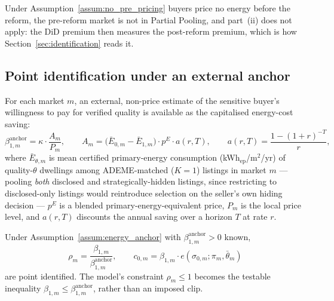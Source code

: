 \noindent Under Assumption~\ref{assum:no_pre_pricing} buyers price no energy before the reform, the pre-reform market is not in Partial Pooling, and part~(ii) does not apply: the DiD premium then measures the post-reform premium, which is how Section~\ref{sec:identification} reads it.

\subsection*{Point identification under an external anchor}

\begin{assumption}
\label{assum:energy_anchor}
For each market $m$, an external, non-price estimate of the sensitive buyer's willingness to
pay for verified quality is available as the capitalised energy-cost saving:
\begin{equation}
    \beta_{1,m}^{\mathrm{anchor}} = \kappa\cdot\frac{A_m}{P_m}, \qquad
    A_m = \big(\bar E_{0,m}-\bar E_{1,m}\big)\cdot p^E\cdot a(r,T), \qquad
    a(r,T)=\frac{1-(1+r)^{-T}}{r},
    \label{eq:energy_anchor}
\end{equation}
where $\bar E_{\theta,m}$ is mean certified primary-energy consumption (kWh$_{\mathrm{ep}}$/m$^2$/yr)
of quality-$\theta$ dwellings among ADEME-matched ($K=1$) listings in market $m$ --- pooling
\emph{both} disclosed and strategically-hidden listings, since restricting to disclosed-only
listings would reintroduce selection on the seller's own hiding decision --- $p^E$ is a
blended primary-energy-equivalent price, $P_m$ is the local price level, and $a(r,T)$ discounts
the annual saving over a horizon $T$ at rate $r$.
\end{assumption}

\begin{proposition}
\label{prop:anchored_identification}
Under Assumption~\ref{assum:energy_anchor} with $\beta_{1,m}^{\mathrm{anchor}}>0$ known,
\begin{equation}
    \rho_m=\frac{\beta_{1,m}}{\beta_{1,m}^{\mathrm{anchor}}}, \qquad
    c_{0,m}=\beta_{1,m}\cdot e(\sigma_{0,m};\pi_m,\bar\theta_m)
    \label{eq:anchored_estimator}
\end{equation}
are point identified. The model's constraint $\rho_m\le1$ becomes the testable inequality
$\beta_{1,m}\le\beta_{1,m}^{\mathrm{anchor}}$, rather than an imposed clip.
\end{proposition}

